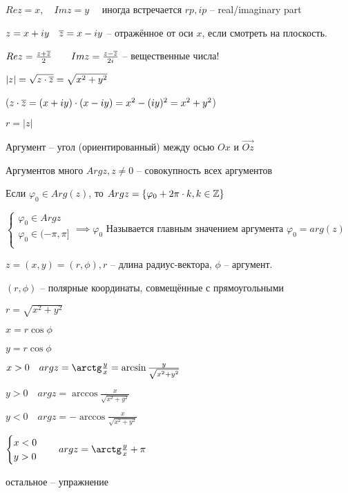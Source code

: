         $Re z = x,\quad Im z = y\quad $ иногда встречается $rp, ip$ -- real/imaginary part

        \begin{note}
            $z = x+iy\quad \overline{z} = x-iy$ -- отражённое от оси $x$, если смотреть на плоскость.

            $Re z = \frac{z+\overline{z}}{2}\qquad Im z = \frac{z-\overline{z}}{2i}$ -- вещественные числа!
        \end{note}

        \begin{note}

            $|z| = \sqrt{z\cdot \overline{z}}  = \sqrt{x^2+y^2} $ 

            ($z\cdot \overline{z} = (x+iy)\cdot (x-iy) = x^2-(iy)^2 = x^2+y^2$)

            $r = |z|$

            Аргумент -- угол (ориентированный) между осью $Ox$ и $\overset{\to }{Oz}$

            Аргументов много $Arg z, z\neq 0$ -- совокупность всех аргументов

            Если $\varphi_0\in Arg (z)$, то $Arg z = \{\varphi_0 + 2\pi\cdot k, k\in \mathbb{Z} \}$

            $\begin{cases}
                \varphi_0\in Arg z\\
                \varphi_0\in (-\pi , \pi ]\\
            \end{cases} \implies  \varphi_0$ Называется главным значением аргумента $\varphi_0 = arg(z)$ 
        \end{note}

        $z = (x,y) = (r,\phi),r$ -- длина радиус-вектора, $\phi$ --  аргумент.

        $(r, \phi)$ -- полярные координаты, совмещённые с прямоугольными
        \begin{note}
            $r = \sqrt{x^2+y^2} $

            $x = r\cos \phi$

            $y = r\cos \phi$

            $x>0\quad arg z = \arctg \frac{y}{x} = \arcsin \frac{y}{\sqrt{x^2+y^2} }$

            $y>0\quad arg z = \arccos \frac{x}{\sqrt{x^2+y^2} }$

            $y<0\quad arg z = -\arccos \frac{x}{\sqrt{x^2+y^2} } $

            $\begin{cases}
                x<0\\
                y>0\\
            \end{cases}\quad arg z = \arctg \frac{y}{x} + \pi $

            остальное -- упражнение
        \end{note}

